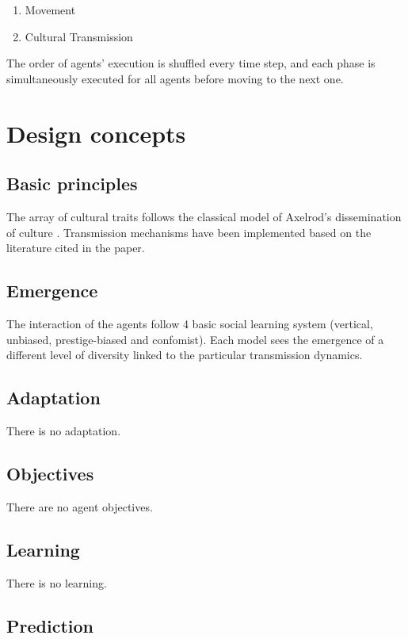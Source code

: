 \documentclass[11pt,a4paper,twocolumn,notitlepage]{article}
\begin{document}
\begin{enumerate}
\item{Movement}
\item{Cultural Transmission}
\end{enumerate}

The order of agents' execution is shuffled every time step, and each phase is simultaneously executed for all agents before moving to the next one.


\section{Design concepts}

\subsection{Basic principles}

The array of cultural traits follows the classical model of Axelrod's dissemination of culture \citep{axelrod_1997}. Transmission mechanisms have been implemented based on the literature cited in the paper.

\subsection{Emergence}

The interaction of the agents follow 4 basic social learning system (vertical, unbiased, prestige-biased and confomist). Each model sees the emergence of a different level of diversity linked to the particular transmission dynamics. 

\subsection{Adaptation}

There is no adaptation.

\subsection{Objectives}

There are no agent objectives.

\subsection{Learning}

There is no learning.

\subsection{Prediction}
\end{document}
